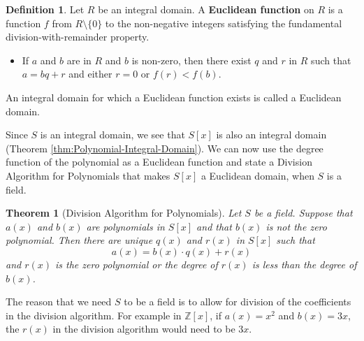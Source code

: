 \documentclass[
]{book}
\providecommand{\tightlist}{%
  \setlength{\itemsep}{0pt}\setlength{\parskip}{0pt}}
\newtheorem{theorem}{Theorem}[chapter]
\theoremstyle{definition}
\newtheorem{definition}{Definition}[chapter]
\theoremstyle{definition}
\theoremstyle{definition}
\theoremstyle{definition}
\theoremstyle{remark}
\begin{document}
\begin{definition}
Let \(R\) be an integral domain. A \textbf{Euclidean function} on \(R\) is a function \(f\) from \(R\setminus \{0\}\) to the non-negative integers satisfying the fundamental division-with-remainder property.

\begin{itemize}
\tightlist
\item
  If \(a\) and \(b\) are in \(R\) and \(b\) is non-zero, then there exist \(q\) and \(r\) in \(R\) such that \(a=bq+r\) and either \(r=0\) or \(f(r)<f(b)\).
\end{itemize}

An integral domain for which a Euclidean function exists is called a Euclidean domain.
\end{definition}

Since \(S\) is an integral domain, we see that \(S[x]\) is also an integral domain (Theorem \ref{thm:Polynomial-Integral-Domain}). We can now use the degree function of the polynomial as a Euclidean function and state a Division Algorithm for Polynomials that makes \(S[x]\) a Euclidean domain, when \(S\) is a field.

\begin{theorem}[Division Algorithm for Polynomials]
\protect\hypertarget{thm:Division-Algorithm-Poly}{}\label{thm:Division-Algorithm-Poly}Let \(S\) be a field. Suppose that \(a(x)\) and \(b(x)\) are polynomials in \(S[x]\) and that \(b(x)\) is not the zero polynomial. Then there are unique \(q(x)\) and \(r(x)\) in \(S[x]\) such that
\[a(x)=b(x)\cdot q(x) + r(x)\] and \(r(x)\) is the zero polynomial or the degree of \(r(x)\) is less than the degree of \(b(x)\).
\end{theorem}

The reason that we need \(S\) to be a field is to allow for division of the coefficients in the division algorithm. For example in \(\mathbb{Z}[x]\), if \(a(x)=x^2\) and \(b(x)=3x\), the \(r(x)\) in the division algorithm would need to be \(3x\).
\end{document}
